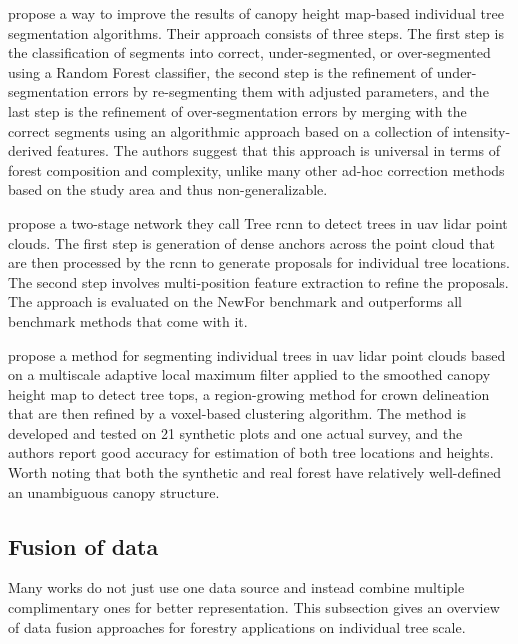 \citet{lisiewiczCorrectingResultsCHMBased2022} propose a way to improve the results of canopy height map-based individual tree segmentation algorithms.
Their approach consists of three steps.
The first step is the classification of segments into correct, under-segmented, or over-segmented using a Random Forest classifier, the second step is the refinement of under-segmentation errors by re-segmenting them with adjusted parameters, and the last step is the refinement of over-segmentation errors by merging with the correct segments using an algorithmic approach based on a collection of intensity-derived features.
The authors suggest that this approach is universal in terms of forest composition and complexity, unlike many other ad-hoc correction methods based on the study area and thus non-generalizable.

\citet{wangAutomaticDetectionIndividual2023} propose a two-stage network they call Tree \gls{rcnn} to detect trees in \gls{uav} \gls{lidar} point clouds.
The first step is generation of dense anchors across the point cloud that are then processed by the \gls{rcnn} to generate proposals for individual tree locations.
The second step involves multi-position feature extraction to refine the proposals.
The approach is evaluated on the NewFor benchmark \citep{eysnAlpineITDBenchmark2015} and outperforms all benchmark methods that come with it.

\citet{fuIndividualTreeSegmentationUAV2024} propose a method for segmenting individual trees in \gls{uav} \gls{lidar} point clouds based on a multiscale adaptive local maximum filter applied to the smoothed canopy height map to detect tree tops, a region-growing method for crown delineation that are then refined by a voxel-based clustering algorithm.
The method is developed and tested on 21 synthetic plots and one actual survey, and the authors report good accuracy for estimation of both tree locations and heights.
Worth noting that both the synthetic and real forest have relatively well-defined an unambiguous canopy structure.

\subsection{Fusion of data}

Many works do not just use one data source and instead combine multiple complimentary ones for better representation.
This subsection gives an overview of data fusion approaches for forestry applications on individual tree scale.

